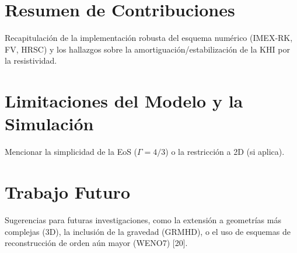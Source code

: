 \section{Resumen de Contribuciones}
    Recapitulación de la implementación robusta del esquema numérico (IMEX-RK, FV, HRSC) y los hallazgos sobre la amortiguación/estabilización de la KHI por la resistividad.
\section{Limitaciones del Modelo y la Simulación}
    Mencionar la simplicidad de la EoS ($\Gamma=4/3$) o la restricción a 2D (si aplica).
\section{Trabajo Futuro}
    Sugerencias para futuras investigaciones, como la extensión a geometrías más complejas (3D), la inclusión de la gravedad (GRMHD), o el uso de esquemas de reconstrucción de orden aún mayor (WENO7) [20].

